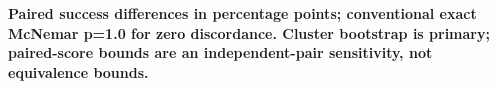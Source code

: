 \begin{center}\begin{minipage}{\linewidth}
\centering
\textbf{Paired success differences in percentage points; conventional exact McNemar p=1.0 for zero discordance. Cluster bootstrap is primary; paired-score bounds are an independent-pair sensitivity, not equivalence bounds.}\par\vspace{3pt}
\small
{}
\end{minipage}\end{center}
